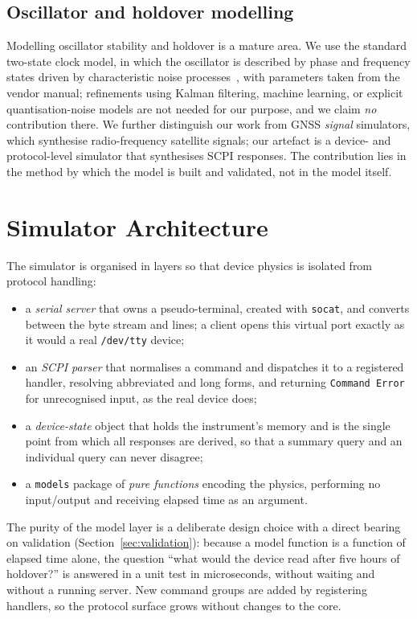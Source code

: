 \documentclass[conference]{IEEEtran}
\begin{document}
\subsection{Oscillator and holdover modelling}
Modelling oscillator stability and holdover is a mature area. We use the
standard two-state clock model, in which the oscillator is described by
phase and frequency states driven by characteristic noise
processes~\cite{zucca2005clock}, with parameters taken from the vendor
manual; refinements using Kalman filtering, machine learning, or
explicit quantisation-noise models are not needed for our purpose, and
we claim \emph{no} contribution there. We further distinguish our work from GNSS
\emph{signal} simulators, which synthesise radio-frequency satellite
signals; our artefact is a device- and protocol-level simulator that
synthesises SCPI responses. The contribution lies in the method by which
the model is built and validated, not in the model itself.

\section{Simulator Architecture}
\label{sec:arch}
The simulator is organised in layers so that device physics is isolated
from protocol handling:
\begin{itemize}
\item a \emph{serial server} that owns a pseudo-terminal, created with
\texttt{socat}, and converts between the byte stream and lines; a
client opens this virtual port exactly as it would a real
\texttt{/dev/tty} device;
\item an \emph{SCPI parser} that normalises a command and dispatches it
to a registered handler, resolving abbreviated and long forms, and
returning \texttt{Command Error} for unrecognised input, as the real
device does;
\item a \emph{device-state} object that holds the instrument's memory
and is the single point from which all responses are derived, so that a
summary query and an individual query can never disagree;
\item a \texttt{models} package of \emph{pure functions} encoding the
physics, performing no input/output and receiving elapsed time as an
argument.
\end{itemize}
The purity of the model layer is a deliberate design choice with a
direct bearing on validation (Section~\ref{sec:validation}): because a
model function is a function of elapsed time alone, the question ``what
would the device read after five hours of holdover?'' is answered in a
unit test in microseconds, without waiting and without a running server.
New command groups are added by registering handlers, so the protocol
surface grows without changes to the core.
\end{document}
